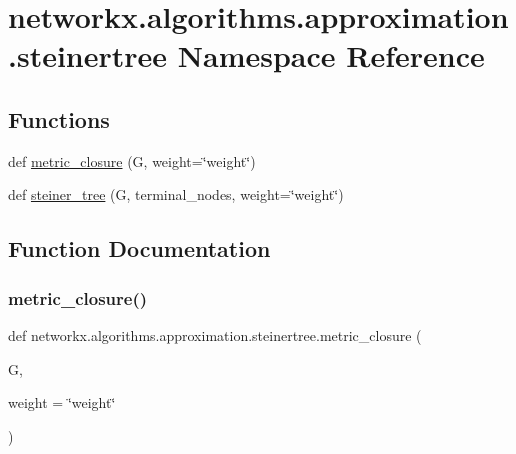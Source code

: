 \hypertarget{namespacenetworkx_1_1algorithms_1_1approximation_1_1steinertree}{}\section{networkx.\+algorithms.\+approximation.\+steinertree Namespace Reference}
\label{namespacenetworkx_1_1algorithms_1_1approximation_1_1steinertree}
\subsection*{Functions}
\begin{DoxyCompactItemize}
\item 
def \hyperlink{namespacenetworkx_1_1algorithms_1_1approximation_1_1steinertree_ad7127d00994e89fe7ec2ed86a0738048}{metric\+\_\+closure} (G, weight=\char`\"{}weight\char`\"{})
\item 
def \hyperlink{namespacenetworkx_1_1algorithms_1_1approximation_1_1steinertree_a855a6b604c977181e6247a476b568391}{steiner\+\_\+tree} (G, terminal\+\_\+nodes, weight=\char`\"{}weight\char`\"{})
\end{DoxyCompactItemize}


\subsection{Function Documentation}
\mbox{\label{namespacenetworkx_1_1algorithms_1_1approximation_1_1steinertree_ad7127d00994e89fe7ec2ed86a0738048}} 
\subsubsection{\texorpdfstring{metric\+\_\+closure()}{metric\_closure()}}
{\footnotesize\ttfamily def networkx.\+algorithms.\+approximation.\+steinertree.\+metric\+\_\+closure (\begin{DoxyParamCaption}\item[{}]{G,  }\item[{}]{weight = {\ttfamily \char`\"{}weight\char`\"{}} }\end{DoxyParamCaption})}

